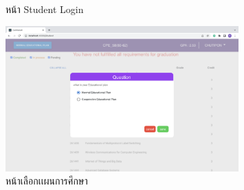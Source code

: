 \begin{figure}[H]
  \begin{center}
  \end{center}
  \caption{หน้า Student Login}
  \label{fig:login}
\end{figure}


\begin{figure}[H]
  \begin{center}
    \includegraphics[width=0.8\textwidth]{question.png}
    \caption{หน้าเลือกเเผนการศึกษา}
    \label{fig:question}
  \end{center}
\end{figure}

